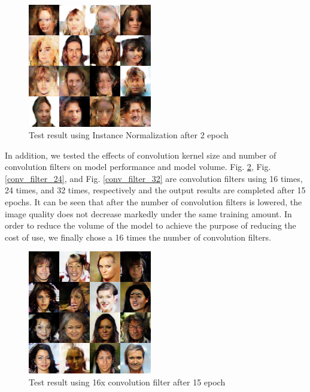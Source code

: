 \begin{figure}
    \begin{center}
    \includegraphics[width=0.48\textwidth]{figures/result_norm_instance.png}
    \caption{Test result using Instance Normalization after 2 epoch}
    \label{norm_instance}
    \end{center}
\end{figure}

In addition, we tested the effects of convolution kernel size and number of convolution filters on model performance and model volume.
 Fig. \ref{conv_filter_16}, Fig. \ref{conv_filter_24}, and Fig. \ref{conv_filter_32} are convolution filters using 16 times, 24 times, and 32 times, respectively and the output results are completed after 15 epochs. 
It can be seen that after the number of convolution filters is lowered, the image quality does not decrease markedly under the same training amount. 
In order to reduce the volume of the model to achieve the purpose of reducing the cost of use, we finally chose a 16 times the number of convolution filters.

\begin{figure}
    \begin{center}
    \includegraphics[width=0.48\textwidth]{figures/result_conv_filter_16.png}
    \caption{Test result using 16x convolution filter after 15 epoch}
    \label{conv_filter_16}
    \end{center}
\end{figure}

